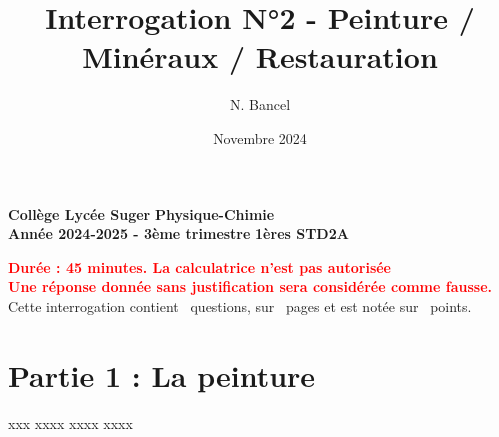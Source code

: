 \documentclass[addpoints]{exam}
\title{Interrogation N°2 - Peinture / Minéraux / Restauration}
\author{N. Bancel}
\date{Novembre 2024}
\begin{document}
\textbf{Collège Lycée Suger}
\hfill
\textbf{Physique-Chimie} \\

\textbf{Année 2024-2025 - 3ème trimestre}
\hfill
\textbf{1ères STD2A} \par

{\let\newpage\relax\maketitle}

\begin{center}
\textbf{\textcolor{red}{Durée : 45 minutes. La calculatrice n'est pas autorisée}} \\
\textbf{\textcolor{red}{Une réponse donnée sans justification sera considérée comme fausse.}} \\
Cette interrogation contient \numquestions\ questions, sur \numpages\ pages et est notée sur \numpoints\ points. 
\end{center}

\section{Partie 1 : La peinture}

\begin{questions}

  \question[4] xxx
  \question[1.5] xxxx
  \question[2] xxxx
  \question[2] xxxx

\end{questions}
\end{document}
